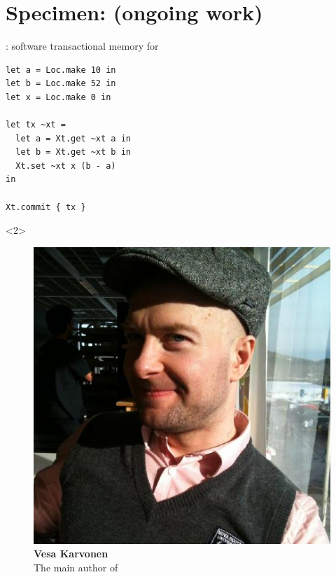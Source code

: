 \newcommand{\kcas}{%
  \kappa%
}

\newcommand{\similar}{%
  \approx%
}
\newcommand{\nonsimilar}{%
  \not\approx
}

\newcommand{\view}{%
  \mathcal{V}%
}
\newcommand{\viewTwo}{%
  \mathcal{W}%
}
\newcommand{\viewJoin}[2]{%
  #1 \sqcup #2%
}

\newcommand{\iKcasPointsto}{%
  \rightarrowtail%
}
\newcommand{\iView}[1]{%
  \sqsupseteq #1%
}

\newcommand{\colorLoc}{blue}
\newcommand{\colorBefore}{red}
\newcommand{\colorAfter}{Green}
\newcommand{\colorReadOnly}{cyan}
\newcommand{\colorResult}{orange}
\newcommand{\colorView}{brown}


\section{Specimen: \Kcas (ongoing work)}

\begin{frame}[fragile]{\Kcas: software transactional memory for \OCaml}
\Large
\begin{verbatim}
let a = Loc.make 10 in
let b = Loc.make 52 in
let x = Loc.make 0 in

let tx ~xt =
  let a = Xt.get ~xt a in
  let b = Xt.get ~xt b in
  Xt.set ~xt x (b - a)
in

Xt.commit { tx }
\end{verbatim}
\begin{overbox}<2>
  \begin{figure}
    \includegraphics[scale=0.2]{images/vesa_karvonen.jpg}
    \caption*{\large \textbf{Vesa Karvonen} \\ \small The main author of \Kcas}
  \end{figure}
\end{overbox}
\end{frame}

